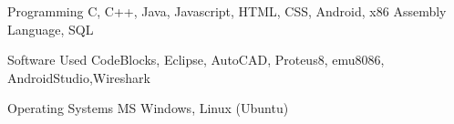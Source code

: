 

\begin{cvskills}

  \cvskill
    {Programming} %
    {C, C++, Java, Javascript, HTML, CSS, Android, x86 Assembly Language, SQL } %

  \cvskill
    {Software Used} %
    {CodeBlocks, Eclipse, AutoCAD, Proteus8, emu8086, AndroidStudio,Wireshark} %

  \cvskill
    {Operating Systems} %
    {MS Windows, Linux (Ubuntu)} %

\end{cvskills}
